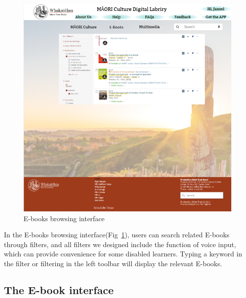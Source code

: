 \begin{figure}[htbp]
  \centerline{\includegraphics[width=400pt]{images/3-2-1.png}}
  \caption{E-books browsing interface}
  \label{fig33}
\end{figure}

In the E-books browsing interface(Fig~\ref{fig33}), users can search related E-books through filters, and all filters we designed include the function of voice input, which can provide convenience for some disabled learners. Typing a keyword in the filter or filtering in the left toolbar will display the relevant E-books.

\subsection{The E-book interface}

